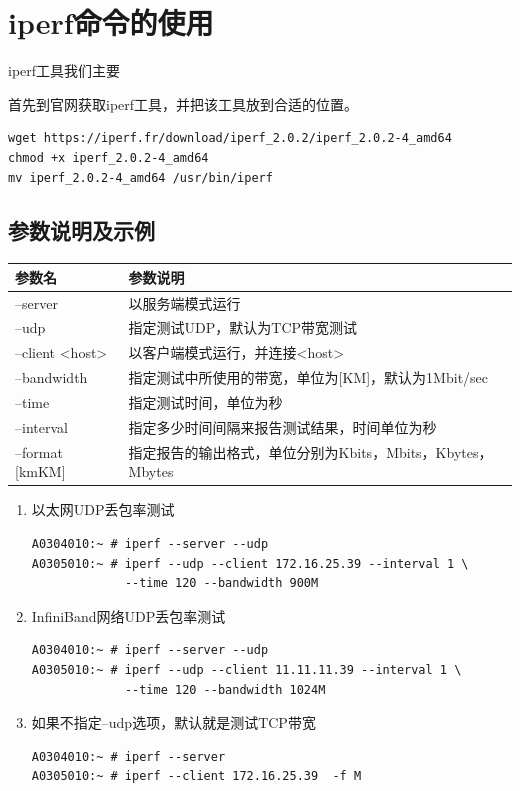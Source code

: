 \section{iperf命令的使用}
\label{sec:iperfCmd}

iperf工具我们主要

首先到官网获取iperf工具，并把该工具放到合适的位置。
\begin{verbatim}
wget https://iperf.fr/download/iperf_2.0.2/iperf_2.0.2-4_amd64
chmod +x iperf_2.0.2-4_amd64
mv iperf_2.0.2-4_amd64 /usr/bin/iperf
\end{verbatim}

\subsection{参数说明及示例}

\begin{tabular}{lp{25em}}
  \toprule
  参数名       & 参数说明 \\
  \midrule
  --server	& 以服务端模式运行 \\
  --udp	        & 指定测试UDP，默认为TCP带宽测试 \\
  --client <host>	& 以客户端模式运行，并连接<host> \\
  --bandwidth	& 指定测试中所使用的带宽，单位为[KM]，默认为1Mbit/sec \\
  --time	        & 指定测试时间，单位为秒 \\
  --interval	& 指定多少时间间隔来报告测试结果，时间单位为秒 \\
  --format [kmKM]	& 指定报告的输出格式，单位分别为Kbits，Mbits，Kbytes，Mbytes \\
\bottomrule
\end{tabular}

\begin{enumerate}[itemsep=0pt,parsep=0pt]
\item 以太网UDP丢包率测试

\begin{verbatim}
A0304010:~ # iperf --server --udp 
A0305010:~ # iperf --udp --client 172.16.25.39 --interval 1 \
             --time 120 --bandwidth 900M
\end{verbatim}

\item InfiniBand网络UDP丢包率测试

\begin{verbatim}
A0304010:~ # iperf --server --udp 
A0305010:~ # iperf --udp --client 11.11.11.39 --interval 1 \
             --time 120 --bandwidth 1024M
\end{verbatim}

\item 如果不指定--udp选项，默认就是测试TCP带宽

\begin{verbatim}
A0304010:~ # iperf --server 
A0305010:~ # iperf --client 172.16.25.39  -f M
\end{verbatim}
\end{enumerate}

